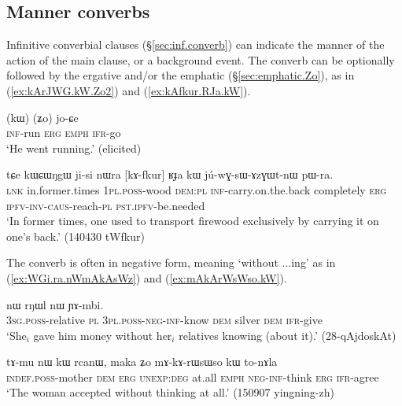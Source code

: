 \subsection{Manner converbs} \label{sec:manner.converbs}
Infinitive converbial clauses (§\ref{sec:inf.converb}) can indicate the manner of the action of the main clause, or a background event. The converb can be optionally followed by the ergative  and/or the emphatic  (§\ref{sec:emphatic.Zo}), as in (\ref{ex:kArJWG.kW.Zo2}) and (\ref{ex:kAfkur.RJa.kW}).

\begin{exe}
\ex \label{ex:kArJWG.kW.Zo2}
\gll [kɤ-rɟɯɣ] (kɯ) (ʑo) jo-ɕe \\
\textsc{inf}-run \textsc{erg} \textsc{emph} \textsc{ifr}-go \\
\glt `He went running.' (elicited)
\end{exe}

\begin{exe}
\ex \label{ex:kAfkur.RJa.kW}
\gll tɕe kɯɕɯŋgɯ ji-si nɯra [kɤ-fkur] ʁɟa kɯ jú-wɣ-sɯ-ɤzɣɯt-nɯ pɯ-ra. \\
\textsc{lnk} in.former.times \textsc{1pl}.\textsc{poss}-wood \textsc{dem}:\textsc{pl} \textsc{inf}-carry.on.the.back completely \textsc{erg} \textsc{ipfv}-\textsc{inv}-\textsc{caus}-reach-\textsc{pl} \textsc{pst}.\textsc{ipfv}-be.needed \\
\glt `In former times, one used to transport firewood exclusively by carrying it on one's back.' (140430 tWfkur)
\end{exe}


The converb is often in negative form, meaning `without ...ing' as in  (\ref{ex:WGi.ra.nWmAkAsWz}) and (\ref{ex:mAkArWsWso.kW}).

\begin{exe}
\ex \label{ex:WGi.ra.nWmAkAsWz}
\gll  [ɯ-ɣi ra nɯ-mɤ-kɤ-sɯz] nɯ rŋɯl nɯ ɲɤ-mbi. \\
\textsc{3sg}.\textsc{poss}-relative \textsc{pl} \textsc{3pl}.\textsc{poss}-\textsc{neg}-\textsc{inf}-know \textsc{dem} silver \textsc{dem} \textsc{ifr}-give \\
\glt `She$_i$ gave him money without her$_i$ relatives knowing (about it).' (28-qAjdoskAt)
\end{exe}


\begin{exe}
\ex \label{ex:mAkArWsWso.kW}
\gll  tɤ-mu nɯ kɯ rcanɯ, maka ʑo mɤ-kɤ-rɯsɯso kɯ to-nɤla \\
\textsc{indef}.\textsc{poss}-mother \textsc{dem} \textsc{erg} \textsc{unexp}:\textsc{deg} at.all \textsc{emph} \textsc{neg}-\textsc{inf}-think \textsc{erg} \textsc{ifr}-agree \\
\glt `The woman accepted without thinking at all.' (150907 yingning-zh)
\end{exe}

